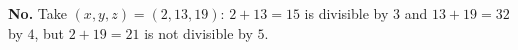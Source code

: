 \textbf{No.} Take $(x,y,z)=(2,13,19)$: $2+13=15$ is divisible by $3$ and $13+19=32$ by $4$, but $2+19=21$ is not divisible by $5$.

